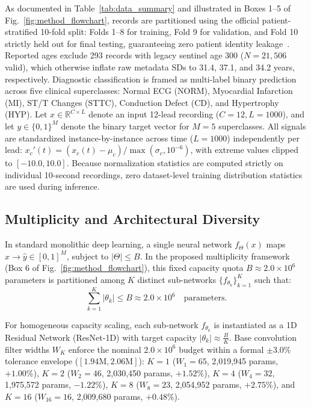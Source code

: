 \documentclass{ICIC2026}
\begin{document}
As documented in Table~\ref{tab:data_summary} and illustrated in Boxes 1--5 of Fig.~\ref{fig:method_flowchart}, records are partitioned using the official patient-stratified 10-fold split: Folds 1--8 for training, Fold 9 for validation, and Fold 10 strictly held out for final testing, guaranteeing zero patient identity leakage~\cite{strodthoff2021deep}. Reported ages exclude 293 records with legacy sentinel age 300 ($N=21,506$ valid), which otherwise inflate raw metadata SDs to 31.4, 37.1, and 34.2 years, respectively. Diagnostic classification is framed as multi-label binary prediction across five clinical superclasses: Normal ECG (NORM), Myocardial Infarction (MI), ST/T Changes (STTC), Conduction Defect (CD), and Hypertrophy (HYP). Let $x \in \mathbb{R}^{C \times L}$ denote an input 12-lead recording ($C = 12, L = 1000$), and let $y \in \{0, 1\}^M$ denote the binary target vector for $M = 5$ superclasses. All signals are standardized instance-by-instance across time ($L=1000$) independently per lead: $x_c'(t) = (x_c(t) - \mu_c) / \max(\sigma_c, 10^{-6})$, with extreme values clipped to $[-10.0, 10.0]$. Because normalization statistics are computed strictly on individual 10-second recordings, zero dataset-level training distribution statistics are used during inference.

\subsection{Multiplicity and Architectural Diversity}
\label{subsec:multiplicity_diversity}

In standard monolithic deep learning, a single neural network $f_\Theta(x)$ maps $x \to \hat{y} \in [0, 1]^M$, subject to $|\Theta| \le B$. In the proposed multiplicity framework (Box 6 of Fig.~\ref{fig:method_flowchart}), this fixed capacity quota $B \approx 2.0 \times 10^6$ parameters is partitioned among $K$ distinct sub-networks $\{f_{\theta_k}\}_{k=1}^K$ such that:
\begin{equation}
\sum_{k=1}^K |\theta_k| \le B \approx 2.0 \times 10^6 \quad \text{parameters}.
\label{eq:budget_constraint}
\end{equation}

For homogeneous capacity scaling, each sub-network $f_{\theta_k}$ is instantiated as a 1D Residual Network (ResNet-1D) with target capacity $|\theta_k| \approx \frac{B}{K}$. Base convolution filter widths $W_K$ enforce the nominal $2.0 \times 10^6$ budget within a formal $\pm 3.0\%$ tolerance envelope ($[1.94\text{M}, 2.06\text{M}]$): $K=1$ ($W_1=65$, 2,019,945 params, $+1.00\%$), $K=2$ ($W_2=46$, 2,030,450 params, $+1.52\%$), $K=4$ ($W_4=32$, 1,975,572 params, $-1.22\%$), $K=8$ ($W_8=23$, 2,054,952 params, $+2.75\%$), and $K=16$ ($W_{16}=16$, 2,009,680 params, $+0.48\%$).
\end{document}
